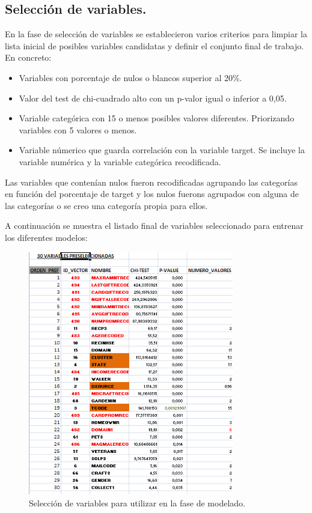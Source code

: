 \subsection{Selección de variables.}

En la fase de selección de variables se establecieron varios criterios para limpiar la lista inicial de posibles variables candidatas y definir el conjunto final de trabajo. En concreto:

\begin{itemize}

\item{Variables con porcentaje de nulos o blancos superior al 20\%.}
\item{Valor del test de chi-cuadrado alto con un p-valor igual o inferior a 0,05.}
\item{Variable categórica con 15 o menos posibles valores diferentes. Priorizando variables con 5 valores o menos.}
\item{Variable númerico que guarda correlación con la variable target. Se incluye la variable numérica y la variable categórica recodificada.}

\end{itemize}

Las variables que contenían nulos fueron recodificadas agrupando las categorías en función del porcentaje de target y los nulos fuerons agrupados con alguna de las categorías o se creo una categoría propia para ellos.

A continuación se muestra el listado final de variables seleccionado para entrenar los diferentes modelos:

\begin{figure}[H]
\begin{center}
\includegraphics[width=0.8\textwidth]{img/seleccion}
\caption{Selección de variables para utilizar en la fase de modelado.}
\end{center}
\end{figure}


